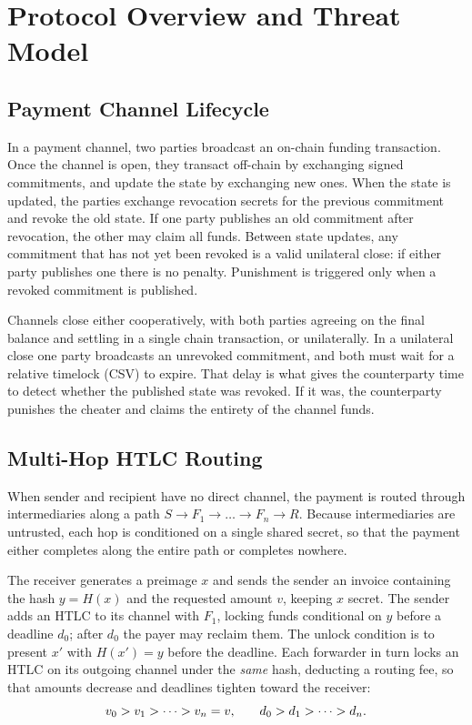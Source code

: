 \section{Protocol Overview and Threat Model}
\label{sec:protocol}

\subsection{Payment Channel Lifecycle}
\label{sec:payment-channel}

In a payment channel, two parties broadcast an on-chain funding transaction.
Once the channel is open, they transact off-chain by exchanging signed
commitments, and update the state by exchanging new ones. When the state is
updated, the parties exchange revocation secrets for the previous commitment
and revoke the old state. If one party publishes an old commitment after
revocation, the other may claim all funds. Between state updates, any
commitment that has not yet been revoked is a valid unilateral close: if either
party publishes one there is no penalty. Punishment is triggered only when a
revoked commitment is published.

Channels close either cooperatively, with both parties agreeing on the final
balance and settling in a single chain transaction, or unilaterally. In a
unilateral close one party broadcasts an unrevoked commitment, and both must
wait for a relative timelock (CSV) to expire. That delay is what gives the
counterparty time to detect whether the published state was revoked. If it was,
the counterparty punishes the cheater and claims the entirety of the channel
funds.

\subsection{Multi-Hop HTLC Routing}
\label{sec:multi-hop-htlc-routing}

When sender and recipient have no direct channel, the payment is routed through
intermediaries along a path $S \to F_1 \to \dots \to F_n \to R$. Because
intermediaries are untrusted, each hop is conditioned on a single shared
secret, so that the payment either completes along the entire path or completes
nowhere.

The receiver generates a preimage $x$ and sends the sender an invoice
containing the hash $y = H(x)$ and the requested amount $v$, keeping $x$
secret. The sender adds an HTLC to its channel with $F_1$, locking funds
conditional on $y$ before a deadline $d_0$; after $d_0$ the payer may reclaim
them. The unlock condition is to present $x'$ with $H(x') = y$ before the
deadline. Each forwarder in turn locks an HTLC on its outgoing channel under
the \emph{same} hash, deducting a routing fee, so that amounts decrease and
deadlines tighten toward the receiver:
\[
\small
v_0 > v_1 > \cdots > v_n = v,
\qquad
d_0 > d_1 > \cdots > d_n .
\]

